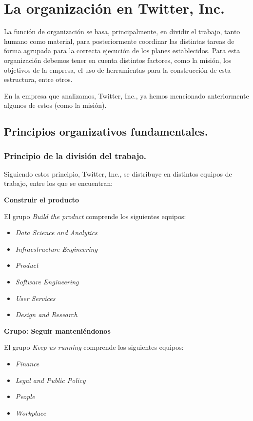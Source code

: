
\section{La organización en Twitter, Inc.}

La función de organización se basa, principalmente, en dividir el trabajo, tanto humano como material, para posteriormente coordinar las distintas tareas de forma agrupada para la correcta ejecución de los planes establecidos. Para esta organización debemos tener en cuenta distintos factores, como la misión, los objetivos de la empresa, el uso de herramientas para la construcción de esta estructura, entre otros.

En la empresa que analizamos, Twitter, Inc., ya hemos mencionado anteriormente algunos de estos (como la misión).

\subsection{Principios organizativos fundamentales.}

\subsubsection{Principio de la división del trabajo.}

Siguiendo estos principio, Twitter, Inc., se distribuye en distintos equipos de trabajo, entre los que se encuentran:

\textbf{Construir el producto}

El grupo \textit{Build the product} comprende los siguientes equipos:

\begin{itemize}

\item \textit{Data Science and Analytics}
\item \textit{Infraestructure Engineering}
\item \textit{Product}
\item \textit{Software Engineering}
\item \textit{User Services}
\item \textit{Design and Research}

\end{itemize}

\textbf{Grupo: Seguir manteniéndonos}

El grupo \textit{Keep us running} comprende los siguientes equipos:

\begin{itemize}

\item \textit{Finance}
\item \textit{Legal and Public Policy}
\item \textit{People}
\item \textit{Workplace}

\end{itemize}

